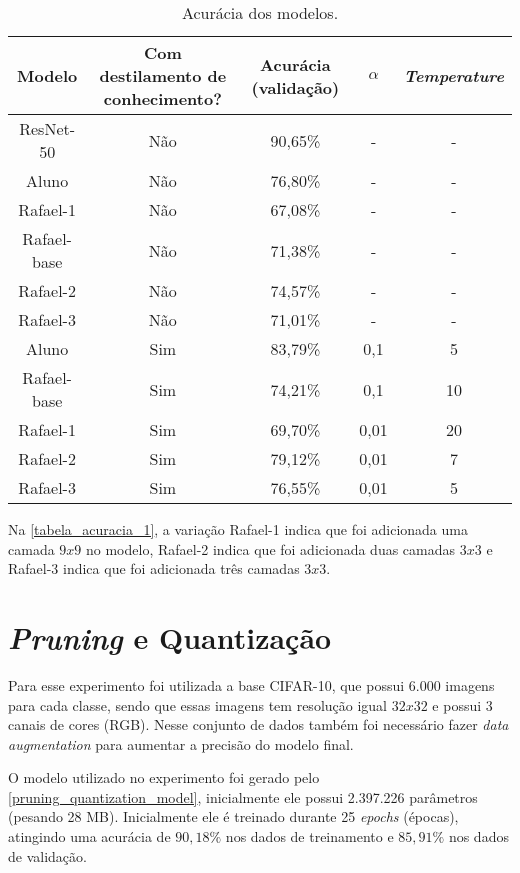 \begin{center}
\begin{table}[htb]
\centering
\ABNTEXfontereduzida
\caption[Acurácia dos modelos]{Acurácia dos modelos.}
\label{tabela_acuracia_1}
\begin{tabular}{ |c|c|c|c|c| }
	\hline
	\textbf{Modelo} & \textbf{Com destilamento de conhecimento?}  & \textbf{Acurácia (validação)}
		   & \textbf{$\alpha$} & \textbf{\textit{Temperature}} \\
	\hline
	ResNet-50 	& 	Não 	& 	90,65\%	& 	- 	& 	-	 \\
	Aluno 		& 	Não 	& 	76,80\%	& 	- 	& 	-	 \\
	Rafael-1 	& 	Não 	& 	67,08\%	& 	- 	& 	-	 \\
	Rafael-base 	& 	Não 	& 	71,38\%	& 	- 	& 	-	 \\
	Rafael-2 	& 	Não 	& 	74,57\%	& 	- 	& 	-	 \\
	Rafael-3 	& 	Não 	& 	71,01\%	& 	- 	& 	-	 \\
	Aluno 		& 	Sim 	& 	83,79\%	& 	0,1 	& 	5	 \\
	Rafael-base 	& 	Sim 	& 	74,21\%	& 	0,1 	& 	10	 \\
	Rafael-1 	& 	Sim 	& 	69,70\%	& 	0,01 	& 	20	 \\
	Rafael-2 	& 	Sim 	& 	79,12\%	& 	0,01 	& 	7	 \\
	Rafael-3 	& 	Sim 	& 	76,55\%	& 	0,01 	& 	5	 \\
	\hline
\end{tabular}
\end{table}
\end{center}

Na \autoref{tabela_acuracia_1}, a variação Rafael-1 indica que foi adicionada uma camada $9x9$ no modelo, Rafael-2
indica que foi adicionada duas camadas $3x3$ e Rafael-3 indica que foi adicionada três camadas $3x3$.

\section{\textit{Pruning} e Quantização}

Para esse experimento foi utilizada a base CIFAR-10, que possui 6.000 imagens para cada classe, sendo que essas imagens
tem resolução igual $32x32$ e possui 3 canais de cores (RGB). Nesse conjunto de dados também foi necessário fazer
\textit{data augmentation} para aumentar a precisão do modelo final.

O modelo utilizado no experimento foi gerado pelo \autoref{pruning_quantization_model}, inicialmente ele possui
2.397.226 parâmetros (pesando 28 MB). Inicialmente ele é treinado durante 25 \textit{epochs} (épocas), atingindo
uma acurácia de $90,18\%$ nos dados de treinamento e $85,91\%$ nos dados de validação.

